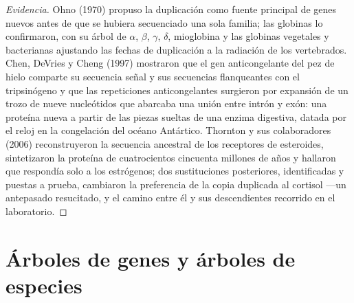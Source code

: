 \begin{proof}[Evidencia]
Ohno (1970) propuso la duplicación como fuente principal de genes
nuevos antes de que se hubiera secuenciado una sola familia; las
globinas lo confirmaron, con su árbol de $\alpha$, $\beta$, $\gamma$,
$\delta$, mioglobina y las globinas vegetales y bacterianas ajustando
las fechas de duplicación a la radiación de los vertebrados. Chen,
DeVries y Cheng (1997) mostraron que el gen anticongelante del pez de
hielo comparte su secuencia señal y sus secuencias flanqueantes con el
tripsinógeno y que las repeticiones anticongelantes surgieron por
expansión de un trozo de nueve nucleótidos que abarcaba una unión entre
intrón y exón: una proteína nueva a partir de las piezas sueltas de una
enzima digestiva, datada por el reloj en la congelación del océano
Antártico. Thornton y sus colaboradores (2006) reconstruyeron la
secuencia ancestral de los receptores de esteroides, sintetizaron la
proteína de cuatrocientos cincuenta millones de años y hallaron que
respondía solo a los estrógenos; dos sustituciones posteriores,
identificadas y puestas a prueba, cambiaron la preferencia de la copia
duplicada al cortisol ---un antepasado resucitado, y el camino entre él
y sus descendientes recorrido en el laboratorio.
\end{proof}

\section{Árboles de genes y árboles de especies}

